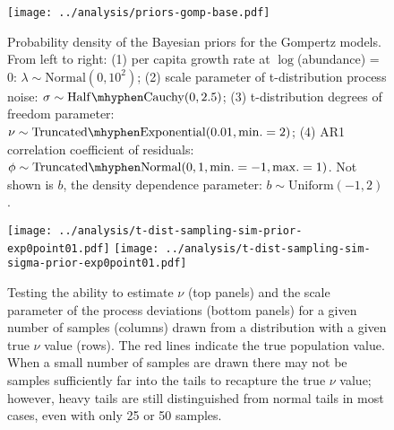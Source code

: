 \clearpage

\begin{figure}[htbp]
\begin{center}
\texttt{[image: ../analysis/priors-gomp-base.pdf]}
\caption{
  Probability density of the Bayesian priors for the Gompertz models. From left
  to right: (1) per capita growth rate at $\log$(abundance) = $0$: $\lambda \sim
  \mathrm{Normal}(0, 10^2)$; (2) scale parameter of t-distribution process
  noise: $\sigma \sim \mathrm{Half\mhyphen Cauchy} (0,
  2.5)$; (3) t-distribution degrees of freedom parameter: $\nu \sim
  \mathrm{Truncated\mhyphen Exponential}(0.01, \mathrm{min.} = 2)$; (4) AR1
  correlation coefficient of residuals: $\phi \sim \mathrm{Truncated \mhyphen
    Normal}(0, 1, \mathrm{min.} = -1, \mathrm{max.} = 1)$. Not shown is $b$,
  the density dependence parameter: $b \sim \mathrm{Uniform}(-1, 2)$.
}
  \label{fig:priors}
\end{center}
\end{figure}

\clearpage

\begin{figure}[htbp]
\begin{center}
\texttt{[image: ../analysis/t-dist-sampling-sim-prior-exp0point01.pdf]}
\texttt{[image: ../analysis/t-dist-sampling-sim-sigma-prior-exp0point01.pdf]}
\caption{
  Testing the ability to estimate $\nu$ (top panels) and the scale parameter of
  the process deviations (bottom panels) for a given number of samples (columns)
  drawn from a distribution with a given true $\nu$ value (rows). The red lines
  indicate the true population value. When a small number of samples are drawn
  there may not be samples sufficiently far into the tails to recapture the
  true $\nu$ value; however, heavy tails are still distinguished from normal
  tails in most cases, even with only 25 or 50 samples.
}
\label{fig:sim-nu}
\end{center}
\end{figure}

\clearpage


